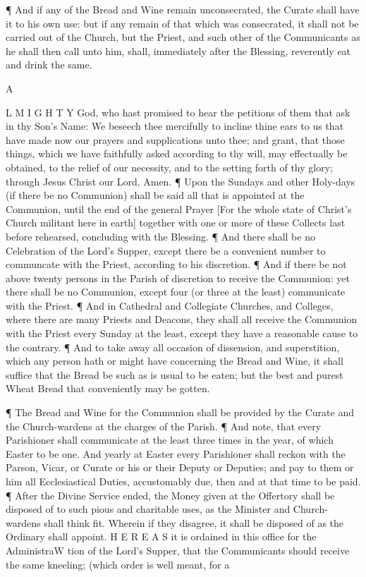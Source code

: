 ¶ And if any of the Bread and Wine remain unconsecrated, the Curate shall have it to his own use: but if any remain of that which was consecrated, it shall not be carried out of the Church, but the Priest, and such other of the Communicants as he shall then call unto him, shall, immediately after the Blessing, reverently eat and drink the same.

A

L M I G H T Y God, who hast promised to hear the petitions of them that ask in thy Son’s Name: We beseech thee mercifully to incline thine ears to us that have made now our prayers and supplications unto thee; and grant, that those things, which we have faithfully asked according to thy will, may effectually be obtained, to the relief of our necessity, and to the setting forth of thy glory; through Jesus Christ our Lord. Amen. ¶ Upon the Sundays and other Holy-days (if there be no Communion) shall be said all that is appointed at the Communion, until the end of the general Prayer [For the whole state of Christ’s Church militant here in earth] together with one or more of these Collects last before rehearsed, concluding with the Blessing. ¶ And there shall be no Celebration of the Lord’s Supper, except there be a convenient number to communcate with the Priest, according to his discretion. ¶ And if there be not above twenty persons in the Parish of discretion to receive the Communion: yet there shall be no Communion, except four (or three at the least) communicate with the Priest. ¶ And in Cathedral and Collegiate Churches, and Colleges, where there are many Priests and Deacons, they shall all receive the Communion with the Priest every Sunday at the least, except they have a reasonable cause to the contrary. ¶ And to take away all occasion of dissension, and superstition, which any person hath or might have concerning the Bread and Wine, it shall suffice that the Bread be such as is usual to be eaten; but the best and purest Wheat Bread that conveniently may be gotten.

¶ The Bread and Wine for the Communion shall be provided by the Curate and the Church-wardens at the charges of the Parish. ¶ And note, that every Parishioner shall communicate at the least three times in the year, of which Easter to be one. And yearly at Easter every Parishioner shall reckon with the Parson, Vicar, or Curate or his or their Deputy or Deputies; and pay to them or him all Ecclesiastical Duties, accustomably due, then and at that time to be paid. ¶ After the Divine Service ended, the Money given at the Offertory shall be disposed of to such pious and charitable uses, as the Minister and Church-wardens shall think fit. Wherein if they disagree, it shall be disposed of as the Ordinary shall appoint. H E R E A S it is ordained in this office for the AdministraW tion of the Lord’s Supper, that the Communicants should receive the same kneeling; (which order is well meant, for a

